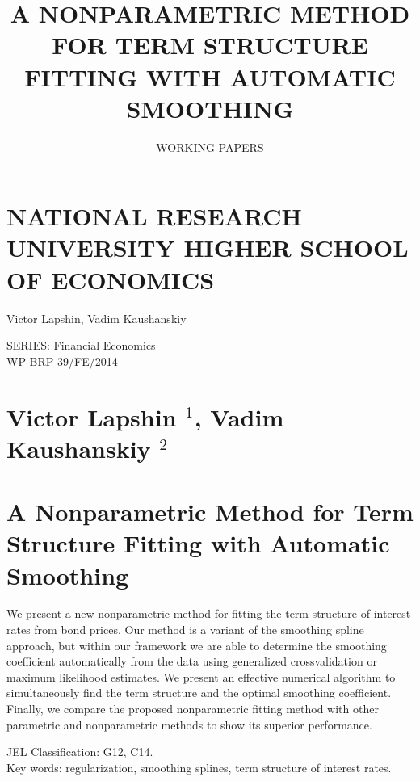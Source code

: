 \documentclass[10pt]{article}
\title{A NONPARAMETRIC METHOD FOR TERM STRUCTURE FITTING WITH AUTOMATIC SMOOTHING }
\author{WORKING PAPERS}
\date{}
\begin{document}
\maketitle
\section*{NATIONAL RESEARCH UNIVERSITY HIGHER SCHOOL OF ECONOMICS}
Victor Lapshin, Vadim Kaushanskiy

SERIES: Financial Economics\\
WP BRP 39/FE/2014

\section*{Victor Lapshin ${ }^{1}$, Vadim Kaushanskiy ${ }^{2}$}
\section*{A Nonparametric Method for Term Structure Fitting with Automatic Smoothing}
We present a new nonparametric method for fitting the term structure of interest rates from bond prices. Our method is a variant of the smoothing spline approach, but within our framework we are able to determine the smoothing coefficient automatically from the data using generalized crossvalidation or maximum likelihood estimates. We present an effective numerical algorithm to simultaneously find the term structure and the optimal smoothing coefficient. Finally, we compare the proposed nonparametric fitting method with other parametric and nonparametric methods to show its superior performance.

JEL Classification: G12, C14.\\
Key words: regularization, smoothing splines, term structure of interest rates.
\end{document}
